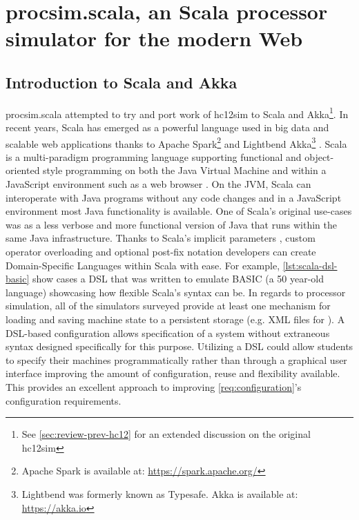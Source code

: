 \chapter{procsim.scala, an Scala processor simulator for the modern Web}
\label{ch:akka-lua-configuration}

\newcommand{\scalainline}[1]{\texttt{#1}}
\newcommand{\akkaActor}{\scalainline{Actor}}

\section{Introduction to Scala and Akka}

procsim.scala attempted to try and port work of hc12sim to Scala and Akka\footnote{See \cref{sec:review-prev-hc12} for an extended discussion on the original hc12sim}. In recent years, Scala has emerged as a powerful language used in big data and scalable web applications thanks to Apache Spark\footnote{Apache Spark is available at: \url{https://spark.apache.org/}} and Lightbend Akka\footnote{Lightbend was formerly known as Typesafe. Akka is available at: \url{https://akka.io}} \cite{Karau2015, Alexandrov2014, Singh2015}. Scala is a multi-paradigm programming language supporting functional and object-oriented style programming on both the Java Virtual Machine and within a JavaScript environment such as a web browser \cite{Scala-Lang}. On the JVM, Scala can interoperate with Java programs without any code changes and in a JavaScript environment most Java functionality is available. One of Scala's original use-cases was as a less verbose and more functional version of Java that runs within the same Java infrastructure. Thanks to Scala's implicit parameters \cite{Scala-ImplicitParameters}, custom operator overloading \cite{Scala-Operators} and optional post-fix notation \cite{Scala-MethodInvocations} developers can create Domain-Specific Languages within Scala with ease. For example, \cref{lst:scala-dsl-basic} show cases a DSL that was written to emulate BASIC (a 50 year-old language) showcasing how flexible Scala's syntax can be. In regards to processor simulation, all of the simulators surveyed provide at least one mechanism for loading and saving machine state to a persistent storage (e.g. XML files for \cite{Skrien2001, Black2013}). A DSL-based configuration allows specification of a system without extraneous syntax designed specifically for this purpose. Utilizing a DSL could allow students to specify their machines programmatically rather than through a graphical user interface improving the amount of configuration, reuse and flexibility available. This provides an excellent approach to improving \cref{req:configuration}'s configuration requirements.

